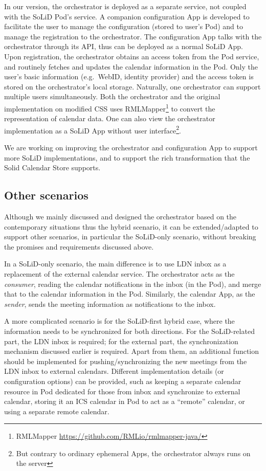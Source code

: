 \documentclass[
twocolumn,
]{ceurart}
\begin{document}
In our version, the orchestrator is deployed as a separate service, not coupled with the SoLiD Pod's service. A companion configuration App is developed to facilitate the user to manage the configuration (stored to user's Pod) and to manage the registration to the orchestrator. The configuration App talks with the orchestrator through its API, thus can be deployed as a normal SoLiD App. Upon registration, the orchestrator obtains an access token from the Pod service, and routinely fetches and updates the calendar information in the Pod. Only the user's basic information (e.g.~WebID, identity provider) and the access token is stored on the orchestrator's local storage. Naturally, one orchestrator can support multiple users simultaneously. Both the orchestrator and the original implementation on modified CSS uses RMLMapper\footnote{RMLMapper \url{https://github.com/RMLio/rmlmapper-java/}} to convert the representation of calendar data.
One can also view the orchestrator implementation as a SoLiD App without user interface\footnote{But contrary to ordinary ephemeral Apps, the orchestrator always runs on the server}.

We are working on improving the orchestrator and configuration App to support more SoLiD implementations, and to support the rich transformation that the Solid Calendar Store supports.

\subsection{Other scenarios}

Although we mainly discussed and designed the orchestrator based on the contemporary situations thus the hybrid scenario, it can be extended/adapted to support other scenarios, in particular the SoLiD-only scenario, without breaking the promises and requirements discussed above.

In a SoLiD-only scenario, the main difference is to use LDN inbox as a replacement of the external calendar service. The orchestrator acts as the \emph{consumer}, reading the calendar notifications in the inbox (in the Pod), and merge that to the calendar information in the Pod. Similarly, the calendar App, as the \emph{sender}, sends the meeting information as notifications to the inbox.

A more complicated scenario is for the SoLiD-first hybrid case, where the information needs to be synchronized for both directions. For the SoLiD-related part, the LDN inbox is required; for the external part, the synchronization mechanism discussed earlier is required. Apart from them, an additional function should be implemented for pushing/synchronizing the new meetings from the LDN inbox to external calendars. Different implementation details (or configuration options) can be provided, such as keeping a separate calendar resource in Pod dedicated for those from inbox and synchronize to external calendar, storing it an ICS calendar in Pod to act as a ``remote'' calendar, or using a separate remote calendar.
\end{document}

